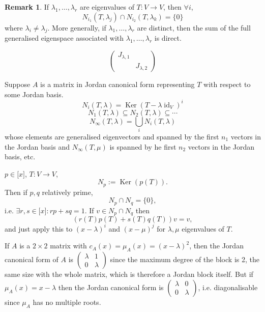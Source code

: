 \documentclass[a4paper]{article}
\newcommand{\Ker}{\operatorname{Ker}}
\newcommand{\id}{\operatorname{id}}
\theoremstyle{definition}
\newtheorem*{remark}{Remark}
\begin{document}
\begin{remark}
    If $\lambda_1,\ldots,\lambda_r$ are eigenvalues of $T:V\rightarrow V$, then $\forall i$,
\[
N_{i_1} (T,\lambda_{j}) \cap N_{i_2} (T,\lambda_{k})=\{0\}
\]
where $\lambda_i \neq \lambda_j$. More generally, if $\lambda_1,\ldots,\lambda_r$ are distinct, then the sum of the full generalised eigenspace associated with $\lambda_1,\ldots,\lambda_r$ is direct.
    
\[
\begin{pmatrix}
    J_{\lambda,1} & \\ & J_{\lambda,2}
    \end{pmatrix}
\]
    
    Suppose $A$ is a matrix in Jordan canonical form representing $T$ with respect to some Jordan basis.
\[
N_i (T,\lambda)=\Ker (T-\lambda \id_V)^i
\]
\[
N_1(T,\lambda) \subseteq N_2(T,\lambda) \subseteq \cdots
\]
\[
N_\infty (T,\lambda) = \bigcup_i N_i (T,\lambda)
\]
whose elements are generalised eigenvectors and spanned by the first $n_1$ vectors in the Jordan basis and $N_\infty (T,\mu)$ is spanned by he first $n_2$ vectors in the Jordan basis, etc.
    
    $p\in \mathbb [x]$, $T:V\rightarrow V$,
\[
N_p := \Ker (p(T)).
\]
Then if $p,q$ relatively prime,
\[
N_p \cap N_q=\{0\},
\]
i.e. $\exists r,s \in \mathbb [x]:rp+sq=1$. If $v\in N_p \cap N_q$ then
\[
(r(T)p(T)+s(T)q(T))v=v,
\]
and just apply this to $(x-\lambda)^i$ and $(x-\mu)^j$ for $\lambda,\mu$ eigenvalues of $T$.
\end{remark}

If $A$ is a $2\times 2$ matrix with $c_{A}(x)=\mu_{A}(x)=(x-\lambda)^2$, then the Jordan canonical form of $A$ is $\begin{pmatrix}\lambda & 1\\0& \lambda\end{pmatrix}$ since the maximum degree of the block is 2, the same size with the whole matrix, which is therefore a Jordan block itself. But if $\mu_{A}(x)=x-\lambda$ then the Jordan canonical form is $\begin{pmatrix}\lambda & 0\\0& \lambda\end{pmatrix}$, i.e. diagonalisable since $\mu_{A}$ has no multiple roots.
\end{document}
